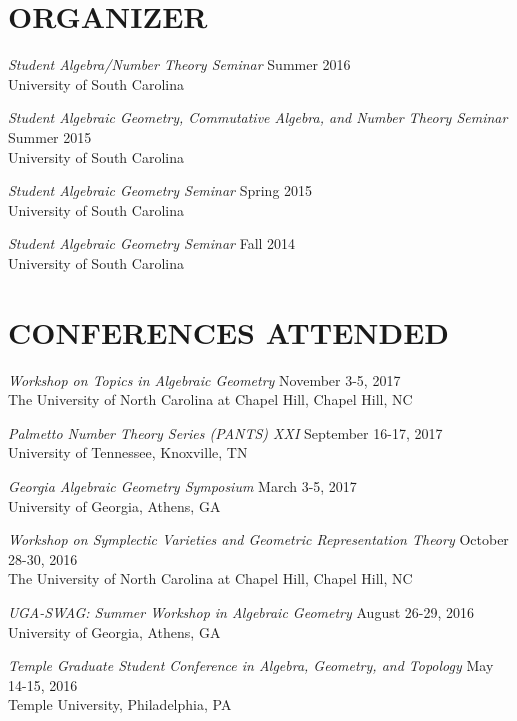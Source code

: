 \documentclass[line,overlapped]{res}
\begin{document}
\begin{resume}
         \section{ORGANIZER}
         {\sl Student Algebra/Number Theory Seminar} \hfill Summer 2016\\
	 University of South Carolina
         
	 {\sl Student Algebraic Geometry, Commutative Algebra, and Number Theory Seminar} \hfill Summer 2015\\
	 University of South Carolina
	 
         {\sl Student Algebraic Geometry Seminar} \hfill Spring 2015\\
	 University of South Carolina

         {\sl Student Algebraic Geometry Seminar} \hfill Fall 2014\\
	 University of South Carolina
 \newpage

 \section{CONFERENCES ATTENDED}
         {\sl Workshop on Topics in Algebraic Geometry} \hfill November 3-5, 2017\\
          The University of North Carolina at Chapel Hill, Chapel Hill, NC
         
         {\sl Palmetto Number Theory Series (PANTS) XXI} \hfill September 16-17, 2017\\
         University of Tennessee, Knoxville, TN
 
 {\sl Georgia Algebraic Geometry Symposium} \hfill March 3-5, 2017\\
 University of Georgia, Athens, GA

 {\sl Workshop on Symplectic Varieties and Geometric Representation Theory} \hfill October 28-30, 2016\\
 The University of North Carolina at Chapel Hill, Chapel Hill, NC
 
 {\sl UGA-SWAG: Summer Workshop in Algebraic Geometry} \hfill August 26-29, 2016\\
 University of Georgia, Athens, GA

         {\sl Temple Graduate Student Conference in Algebra, Geometry, and Topology} \hfill May 14-15, 2016\\
         Temple University, Philadelphia, PA
         

\end{resume}
\end{document}
